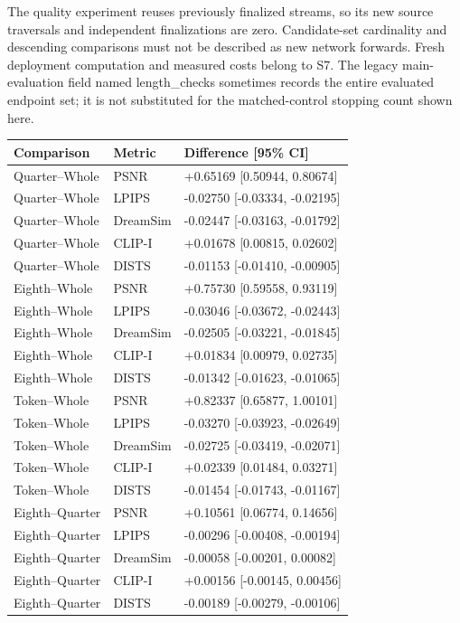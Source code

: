 \documentclass[10pt,letterpaper]{article}
\begin{document}
The quality experiment reuses previously finalized streams, so its new source traversals and independent finalizations are zero. Candidate-set cardinality and descending comparisons must not be described as new network forwards. Fresh deployment computation and measured costs belong to S7. The legacy main-evaluation field named length\_checks sometimes records the entire evaluated endpoint set; it is not substituted for the matched-control stopping count shown here.

\begin{longtable}{@{}lll@{}}\toprule
Comparison & Metric & Difference [95\% CI]\\\midrule\endhead
Quarter--Whole & PSNR & +0.65169 [0.50944, 0.80674]\\
Quarter--Whole & LPIPS & -0.02750 [-0.03334, -0.02195]\\
Quarter--Whole & DreamSim & -0.02447 [-0.03163, -0.01792]\\
Quarter--Whole & CLIP-I & +0.01678 [0.00815, 0.02602]\\
Quarter--Whole & DISTS & -0.01153 [-0.01410, -0.00905]\\
Eighth--Whole & PSNR & +0.75730 [0.59558, 0.93119]\\
Eighth--Whole & LPIPS & -0.03046 [-0.03672, -0.02443]\\
Eighth--Whole & DreamSim & -0.02505 [-0.03221, -0.01845]\\
Eighth--Whole & CLIP-I & +0.01834 [0.00979, 0.02735]\\
Eighth--Whole & DISTS & -0.01342 [-0.01623, -0.01065]\\
Token--Whole & PSNR & +0.82337 [0.65877, 1.00101]\\
Token--Whole & LPIPS & -0.03270 [-0.03923, -0.02649]\\
Token--Whole & DreamSim & -0.02725 [-0.03419, -0.02071]\\
Token--Whole & CLIP-I & +0.02339 [0.01484, 0.03271]\\
Token--Whole & DISTS & -0.01454 [-0.01743, -0.01167]\\
Eighth--Quarter & PSNR & +0.10561 [0.06774, 0.14656]\\
Eighth--Quarter & LPIPS & -0.00296 [-0.00408, -0.00194]\\
Eighth--Quarter & DreamSim & -0.00058 [-0.00201, 0.00082]\\
Eighth--Quarter & CLIP-I & +0.00156 [-0.00145, 0.00456]\\
Eighth--Quarter & DISTS & -0.00189 [-0.00279, -0.00106]\\

\end{longtable}
\end{document}
